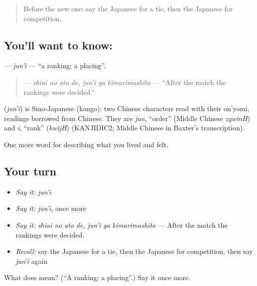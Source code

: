 \begin{quote}
Before the new one: say the Japanese for a tie, then the Japanese for competition.
\end{quote}

\subsection*{You'll want to know: }
\textbf{} — \emph{jun'i} — \textquotedblleft{}a ranking; a placing\textquotedblright{}.

\begin{quote}
\textbf{  } — \emph{shiai no ato de, jun'i ga kimarimashita} — \textquotedblleft{}After the match the rankings were decided.\textquotedblright{}
\end{quote}

\begin{cousinweb}
\textbf{} (\emph{jun'i}) is Sino-Japanese (kango): two Chinese characters read with their on'yomi, readings borrowed from Chinese. They are \emph{jun}, \textquotedblleft{}order\textquotedblright{} (Middle Chinese \emph{zywinH}) and \emph{i}, \textquotedblleft{}rank\textquotedblright{} (\emph{hwijH}) (KANJIDIC2; Middle Chinese in Baxter's transcription).
\end{cousinweb}

\begin{grammarlens}[title={What you've built}]
One more word for describing what you lived and felt.
\end{grammarlens}

\subsection*{Your turn}
\begin{itemize}
\raggedright
  \item \emph{Say it:} \emph{jun'i}
  \item \emph{Say it:} \emph{jun'i}, once more
  \item \emph{Say it:} \emph{shiai no ato de, jun'i ga kimarimashita} — After the match the rankings were decided.
  \item \emph{Recall:} say the Japanese for a tie, then the Japanese for competition, then say \emph{jun'i} again
\end{itemize}

\begin{tcolorbox}[breakable,colback=teal!4,colframe=teal!35!black,title={Before you move on}]
What does  mean? (\textquotedblleft{}A ranking; a placing\textquotedblright{}.) Say it once more.
\end{tcolorbox}
